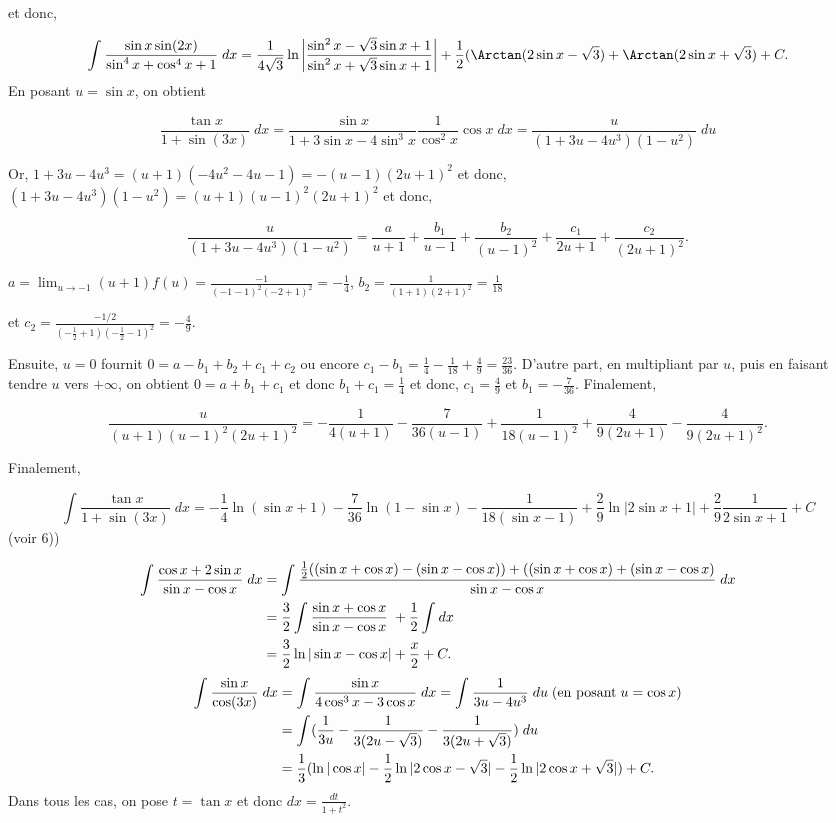{{et donc,

$$\int_{}^{}\frac{\sin x\sin(2x)}{\sin^4x+\cos^4x+1}\;dx=\frac{1}{4\sqrt{3}}\ln\left|
\frac{\sin^2x-\sqrt{3}\sin x+1}{\sin^2x+\sqrt{3}\sin x+1}\right|+\frac{1}{2}(\Arctan(2\sin x-\sqrt{3})+\Arctan(2\sin x+\sqrt{3})+C.$$
En posant $u=\sin x$, on obtient 

$$\frac{\tan x}{1+\sin(3x)}\;dx=\frac{\sin x}{1+3\sin x-4\sin^3x}\frac{1}{\cos^2x}\cos x\;dx=\frac{u}{(1+3u-4u^3)(1-u^2)}\;du$$

Or, $1+3u-4u^3=(u+1)(-4u^2-4u-1)=-(u-1)(2u+1)^2$ et donc, $(1+3u-4u^3)(1-u^2)=(u+1)(u-1)^2(2u+1)^2$ et donc,

$$\frac{u}{(1+3u-4u^3)(1-u^2)}=\frac{a}{u+1}+\frac{b_1}{u-1}+\frac{b_2}{(u-1)^2}+\frac{c_1}{2u+1}+\frac{c_2}{(2u+1)^2}.$$

$a=\lim_{u\rightarrow -1}(u+1)f(u)=\frac{-1}{(-1-1)^2(-2+1)^2}=-\frac{1}{4}$, $b_2=\frac{1}{(1+1)(2+1)^2}=\frac{1}{18}$

et $c_2=\frac{-1/2}{(-\frac{1}{2}+1)(-\frac{1}{2}-1)^2}=-\frac{4}{9}$.

Ensuite, $u=0$ fournit $0=a-b_1+b_2+c_1+c_2$ ou encore $c_1-b_1=\frac{1}{4}-\frac{1}{18}+\frac{4}{9}=\frac{23}{36}$. D'autre part, en multipliant par $u$, puis en faisant tendre $u$ vers $+\infty$, on obtient $0=a+b_1+c_1$ et donc $b_1+c_1=\frac{1}{4}$ et donc, $c_1=\frac{4}{9}$ et $b_1=-\frac{7}{36}$. Finalement,

$$\frac{u}{(u+1)(u-1)^2(2u+1)^2}=-\frac{1}{4(u+1)}-\frac{7}{36(u-1)}+\frac{1}{18(u-1)^2}+\frac{4}{9(2u+1)}-\frac{4}{9(2u+1)^2}.$$

Finalement,

$$\int_{}^{}\frac{\tan x}{1+\sin(3x)}\;dx=-\frac{1}{4}\ln(\sin x+1)-\frac{7}{36}\ln(1-\sin x)-\frac{1}{18(\sin x-1)}+\frac{2}{9}\ln|2\sin x+1|+\frac{2}{9}\frac{1}{2\sin x+1}+C$$
(voir 6)) 

\begin{align*}\ensuremath
\int_{}^{}\frac{\cos x+2\sin x}{\sin x-\cos x}\;dx&=\int_{}^{}\frac{\frac{1}{2}((\sin x+\cos x)-(\sin x-\cos x))+((\sin x+\cos x)+(\sin x-\cos x)}{\sin x-\cos x}\;dx\\
 &=\frac{3}{2}\int_{}^{}\frac{\sin x+\cos x}{\sin x-\cos x}\;+\frac{1}{2}\int_{}^{}dx\\
 &=\frac{3}{2}\ln|\sin x-\cos x|+\frac{x}{2}+C.
\end{align*}
\begin{align*}\ensuremath
\int_{}^{}\frac{\sin x}{\cos(3x)}\;dx&=\int_{}^{}\frac{\sin x}{4\cos^3x-3\cos x}\;dx
=\int_{}^{}\frac{1}{3u-4u^3}\;du\;(\mbox{en posant}\;u=\cos x)\\
 &=\int_{}^{}(\frac{1}{3u}-\frac{1}{3(2u-\sqrt{3})}-\frac{1}{3(2u+\sqrt{3})})\;du\\
 &=\frac{1}{3}(\ln|\cos x|-\frac{1}{2}\ln|2\cos x-\sqrt{3}|-\frac{1}{2}\ln|2\cos x+\sqrt{3}|)+C.
\end{align*}
Dans tous les cas, on pose $t=\tan x$ et donc $dx=\frac{dt}{1+t^2}$.

}}
